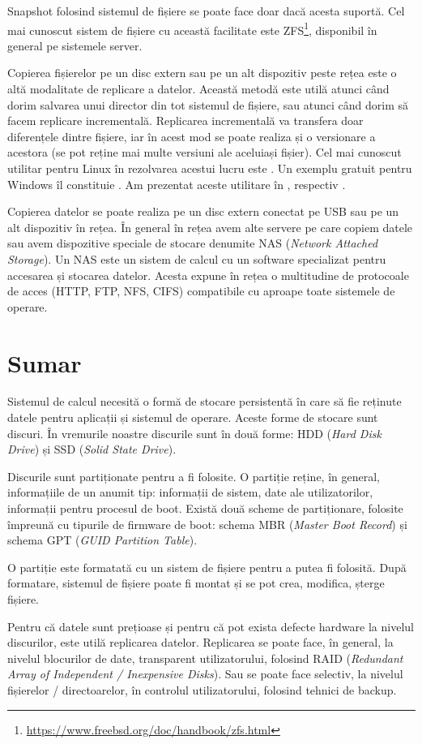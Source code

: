 Snapshot folosind sistemul de fișiere se poate face doar dacă acesta suportă.
Cel mai cunoscut sistem de fișiere cu această facilitate este ZFS\footnote{\url{https://www.freebsd.org/doc/handbook/zfs.html}}, disponibil în general pe
sistemele server.

Copierea fișierelor pe un disc extern sau pe un alt dispozitiv peste rețea este
o altă modalitate de replicare a datelor. Această metodă este utilă atunci când
dorim salvarea unui director din tot sistemul de fișiere, sau atunci când dorim
să facem replicare incrementală. Replicarea incrementală va transfera doar
diferențele dintre fișiere, iar în acest mod se poate realiza și o versionare a
acestora (se pot reține mai multe versiuni ale aceluiași fișier). Cel mai
cunoscut utilitar pentru Linux în rezolvarea acestui lucru este . Un
exemplu gratuit pentru Windows îl constituie . Am prezentat aceste
utilitare în , respectiv .

Copierea datelor se poate realiza pe un disc extern conectat pe USB sau pe un
alt dispozitiv în rețea. În general în rețea avem alte servere pe care copiem
datele sau avem dispozitive speciale de stocare denumite NAS
 (\textit{Network Attached
Storage}). Un NAS este un sistem de calcul cu un software specializat pentru
accesarea și stocarea datelor. Acesta expune în rețea o multitudine de
protocoale de acces (HTTP, FTP, NFS, CIFS) compatibile cu aproape toate
sistemele de operare.

\section{Sumar}
\label{sec:storage:summary}

Sistemul de calcul necesită o formă de stocare persistentă în care să fie reținute datele pentru aplicații și sistemul de operare.
Aceste forme de stocare sunt discuri.
În vremurile noastre discurile sunt în două forme: HDD (\textit{Hard Disk Drive}) și SSD (\textit{Solid State Drive}).

Discurile sunt partiționate pentru a fi folosite.
O partiție reține, în general, informațiile de un anumit tip: informații de sistem, date ale utilizatorilor, informații pentru procesul de boot.
Există două scheme de partiționare, folosite împreună cu tipurile de firmware de boot: schema MBR (\textit{Master Boot Record}) și schema GPT (\textit{GUID Partition Table}).

O partiție este formatată cu un sistem de fișiere pentru a putea fi folosită.
După formatare, sistemul de fișiere poate fi montat și se pot crea, modifica, șterge fișiere.

Pentru că datele sunt prețioase și pentru că pot exista defecte hardware la nivelul discurilor, este utilă replicarea datelor.
Replicarea se poate face, în general, la nivelul blocurilor de date, transparent utilizatorului, folosind RAID (\textit{Redundant Array of Independent / Inexpensive Disks}).
Sau se poate face selectiv, la nivelul fișierelor / directoarelor, în controlul utilizatorului, folosind tehnici de backup.
